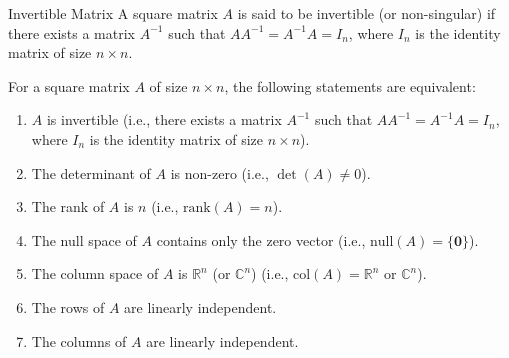\documentclass[openany]{book}
\begin{document}
\begin{mydefinition}{Invertible Matrix}
A square matrix $A$ is said to be invertible (or non-singular) if there exists a matrix $A^{-1}$ such that $AA^{-1} = A^{-1}A = I_n$, where $I_n$ is the identity matrix of size $n \times n$.
\end{mydefinition}
\begin{mytheorem}
For a square matrix $A$ of size $n \times n$, the following statements are equivalent:
\begin{enumerate}
    \item $A$ is invertible (i.e., there exists a matrix $A^{-1}$ such that $AA^{-1} = A^{-1}A = I_n$, where $I_n$ is the identity matrix of size $n \times n$).
    \item The determinant of $A$ is non-zero (i.e., $\det(A) \neq 0$).
    \item The rank of $A$ is $n$ (i.e., $\text{rank}(A) = n$).
    \item The null space of $A$ contains only the zero vector (i.e., $\text{null}(A) = \{ \mathbf{0} \}$).
    \item The column space of $A$ is $\mathbb{R}^n$ (or $\mathbb{C}^n$) (i.e., $\text{col}(A) = \mathbb{R}^n$ or $\mathbb{C}^n$).
    \item The rows of $A$ are linearly independent.
    \item The columns of $A$ are linearly independent.
\end{enumerate}
\end{mytheorem}
\end{document}
